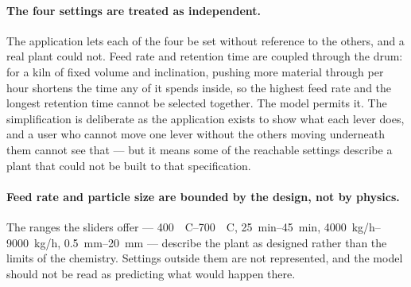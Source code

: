 \paragraph{The four settings are treated as independent.}
The application lets each of the four be set without reference to the others, and a real plant could not. Feed rate and retention time are coupled through the drum: for a kiln of fixed volume and inclination, pushing more material through per hour shortens the time any of it spends inside, so the highest feed rate and the longest retention time cannot be selected together. The model permits it. The simplification is deliberate as the application exists to show what each
lever does, and a user who cannot move one lever without the others moving underneath them cannot see that --- but it means some of the reachable settings describe a plant that could not be built to that specification.

\paragraph{Feed rate and particle size are bounded by the design, not by
physics.}
The ranges the sliders offer --- \SIrange{400}{700}{\textdegree C},
\SIrange{25}{45}{min}, \SIrange{4000}{9000}{kg/h}, \SIrange{0.5}{20}{mm} --- describe the plant as designed rather than the limits
of the chemistry. Settings outside them are not represented, and the model should not be read as predicting what would happen there.

